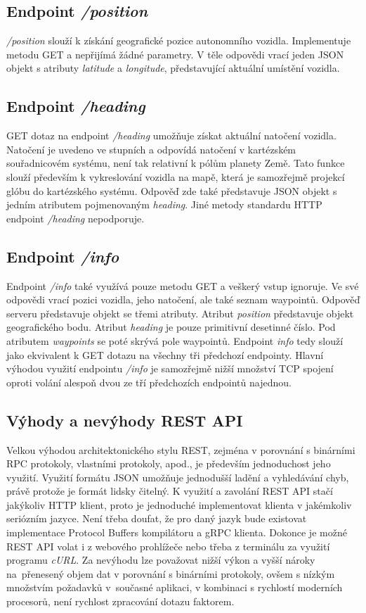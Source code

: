 \documentclass[czech, bachelor]{diploma}
\begin{document}
\subsection{Endpoint \emph{/position}}

\emph{/position} slouží k získání geografické pozice autonomního vozidla. Implementuje metodu GET a nepřijímá žádné parametry.
V těle odpovědi vrací jeden JSON objekt s atributy \emph{latitude} a \emph{longitude}, představující aktuální umístění vozidla.

\subsection{Endpoint \emph{/heading}}

GET dotaz na endpoint \emph{/heading} umožňuje získat aktuální natočení vozidla. Natočení je uvedeno ve stupních a odpovídá
natočení v kartézském souřadnicovém systému, není tak relativní k pólům planety Země. Tato funkce slouží především k vykreslování
vozidla na mapě, která je samozřejmě projekcí glóbu do kartézského systému. Odpověď zde také představuje JSON objekt s jedním
atributem pojmenovaným \emph{heading}. Jiné metody standardu HTTP endpoint \emph{/heading} nepodporuje.

\subsection{Endpoint \emph{/info}}

Endpoint \emph{/info} také využívá pouze metodu GET a veškerý vstup ignoruje. Ve své odpovědi vrací pozici vozidla, jeho
natočení, ale také seznam waypointů.  Odpověď serveru představuje objekt se třemi atributy. Atribut \emph{position} představuje
objekt geografického bodu. Atribut \emph{heading} je pouze primitivní desetinné číslo. Pod atributem \emph{waypoints} se poté
skrývá pole waypointů. Endpoint \emph{info} tedy slouží jako ekvivalent k GET dotazu na všechny tři předchozí endpointy. Hlavní
výhodou využití endpointu \emph{/info} je samozřejmě nižší množství TCP spojení oproti volání alespoň dvou ze tří předchozích
endpointů najednou. 

\subsection{Výhody a nevýhody REST API}

Velkou výhodou architektonického stylu REST, zejména v porovnání s binárními RPC protokoly, vlastními protokoly, apod., je
především jednoduchost jeho využití. Využití formátu JSON umožňuje jednodušší ladění a vyhledávání chyb, právě protože je formát
lidsky čitelný. K využití a zavolání REST API stačí jakýkoliv HTTP klient, proto je jednoduché implementovat klienta v jakémkoliv
seriózním jazyce. Není třeba doufat, že pro daný jazyk bude existovat implementace Protocol Buffers kompilátoru a gRPC klienta.
Dokonce je možné REST API volat i z webového prohlížeče nebo třeba z terminálu za využití programu \emph{cURL}. Za nevýhodu lze
považovat nižší výkon a vyšší nároky na~přenesený objem dat v porovnání s binárními protokoly, ovšem s nízkým množstvím požadavků
v~současné aplikaci, v kombinaci s rychlostí moderních procesorů, není rychlost zpracování dotazu faktorem.
\end{document}
